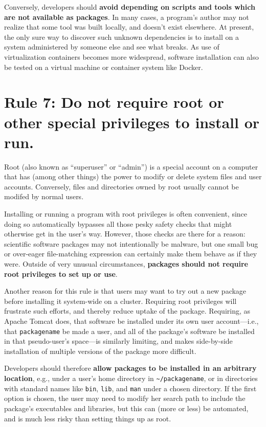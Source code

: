\documentclass[10pt,letterpaper]{article}
\newcommand{\rulemajor}[1]{\section{#1}}
\newcommand{\ruleminor}[1]{\textbf{#1}}
\begin{document}
Conversely, developers should
\ruleminor{avoid depending on scripts and tools which are not available as packages}.
In many cases, a program's author may not realize that some tool was built locally, and
doesn't exist elsewhere. At present, the only sure way to discover such
unknown dependencies is to install on a system administered by someone
else and see what breaks. As use of virtualization containers becomes more
widespread, software installation can also be tested on a virtual machine or
container system like Docker.

\rulemajor{Rule 7: Do not require root or other special privileges to install or run.}

Root (also known as ``superuser'' or ``admin'') is a special account on
a computer that has (among other things) the power to modify or delete
system files and user accounts. Conversely, files and directories owned
by root usually cannot be modifed by normal users.

Installing or running a program with root privileges is often
convenient, since doing so automatically bypasses all those pesky safety
checks that might otherwise get in the user's way. However, those checks
are there for a reason: scientific software packages may not
intentionally be malware, but one small bug or over-eager file-matching
expression can certainly make them behave as if they were. Outside of
very unusual circumstances,
\ruleminor{packages should not require root privileges to set up or use}.

Another reason for this rule is that users may want to try out a new
package before installing it system-wide on a cluster. Requiring root
privileges will frustrate such efforts, and thereby reduce uptake of the
package. Requiring, as Apache Tomcat does, that software be installed
under its own user account---i.e.,
that \texttt{packagename} be made a user, and all of the
package's software be installed in that pseudo-user's space---is similarly limiting,
and makes side-by-side installation of multiple versions of
the package more difficult.

Developers should therefore
\ruleminor{allow packages to be installed in an arbitrary location},
e.g., under a user's home directory in
\texttt{\textasciitilde{}/packagename}, or in directories with standard
names like \texttt{bin}, \texttt{lib}, and \texttt{man} under a chosen
directory. If the first option is chosen, the user may need to modify
her search path to include the package's executables and libraries, but
this can (more or less) be automated, and is much less risky than
setting things up as root.
\end{document}

